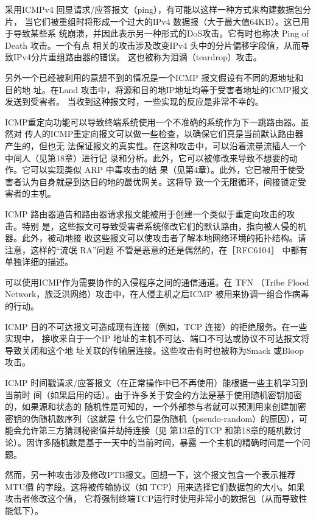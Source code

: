 采用ICMPv4 回显请求/应答报文（ping），有可能以这样一种方式来构建数据包分片，
当它们被重组时将形成一个过大的IPv4 数据报（大于最大值64KB）。这已用于导致某些系
统崩溃，并因此表示另一种形式的DoS攻击。它有时也称决 Ping of Death 攻击。一个有点
相关的攻击涉及改变IPv4 头中的分片偏移字段值，从而导致IPv4分片重组路由器的错误。
这也被称为泪滴（teardrop）攻击。

另外一个已经被利用的意想不到的情况是一个ICMP 报文假设有不同的源地址和目的地
址。在Land 攻击中，将源和目的地IP地址均等于受害者地址的ICMP报文发送到受害者。
当收到这种报文时，一些实现的反应是非常不幸的。

ICMP重定向功能可以导致终端系统使用一个不准确的系统作为下一跳路由器。虽然对
传人的ICMP重定向报文可以做一些检查，以确保它们真是当前默认路由器产生的，但也无
法保证报文的真实性。在这种攻击中，可以沿着流量流插人一个中间人（见第18章）进行记
录和分析。此外，它可以被修改来导致不想要的动作。它可以实现类似 ARP 中毒攻击的结
果（见第4章）。此外，它已被用于使受害者认为自身就是到达目的地的最优网关。这将导
致一个无限循环，间接锁定受害者的主机。

ICMP 路由器通告和路由器请求报文能被用于创建一个类似于重定向攻击的攻击。特别
是，这些报文可导致受害者系统修改它们的默认路由，指向被人侵的机器。此外，被动地接
收这些报文可以使攻击者了解本地网络环境的拓扑结构。请注意，这样的“流氓 RA”问题
不管是恶意的还是偶然的，在［RFC6104］ 中都有单独详细的描述。

可以使用ICMP作为需要协作的入侵程序之间的通信通道。在 TFN （Tribe Flood
Network，族泛洪网络）攻击中，在人侵主机之后ICMP 被用来协调一组合作病毒的行动。

ICMP 目的不可达报文可造成现有连接（例如，TCP 连接）的拒绝服务。在一些实现中，
接收来自于一个IP 地址的主机不可达、端口不可达或协议不可达报文将导致关闭和这个地
址关联的传输层连接。这些攻击有时也被称为Smack 或Bloop 攻击。

ICMP 时间戳请求/应答报文（在正常操作中已不再使用）能根据一些主机学习到当前时
间（如果启用的话）。由于许多关于安全的方法是基于使用随机密钥加密的，如果源和状态的
随机性是可知的，一个外部参与者就可以预测用来创建加密密钥的伪随机数序列（这就是
什么它们是伪随机（pseudo-random）的原因），可能会允许第三方猜测秘密值并劫持连接（见
第13章的TCP 和第18章的随机数讨论）。因许多随机数是基于一天中的当前时间，暴露
一个主机的精确时间是一个问题。

然而，另一种攻击涉及修改PTB报文。回想一下，这个报文包含一个表示推荐MTU價
的字段。这将被传输协议（如 TCP）用来选择它们数据包的大小。如果攻击者修改这个值，
它将强制终端TCP运行时使用非常小的数据包（从而导致性能低下）。

